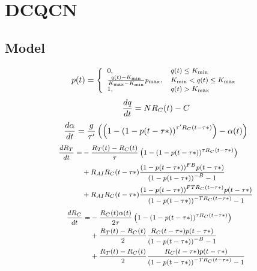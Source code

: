 \section{DCQCN}

\subsection{Model}

\begin{equation}
\small
p(t) = \left\{ \begin{array}{ll}
{\rm{0,}} & q(t) \le {K_{\min }}\\
\frac{{q(t) - {K_{\min }}}}{{{K_{\max }} - {K_{\min }}}}{p_{\max }}, & {K_{\min }} < q(t) \le {K_{\max }}\\
{\rm{1,}} & q(t) > {K_{\max }}
\end{array} \right.
\label{eq:mark}
\end{equation}
\begin{equation}
\small
\frac{{dq}}{{dt}} = N{R_C}(t) - C
\label{eq:q}
\end{equation}
\begin{equation}
\small
\frac{{d\alpha }}{{dt}} = \frac{g}{{\tau '}}\left( {\left( {1 - {{(1 - p(t - \tau *))}^{\tau '{R_C}(t - \tau *)}}} \right) - \alpha (t)} \right)
\label{eq:alpha}
\end{equation}
\begin{equation}
\small
\begin{split}
\frac{{d{R_T}}}{{dt}} = & - \frac{{{R_T}(t) - {R_C}(t)}}{\tau }\left( {1 - {{(1 - p(t - \tau *))}^{\tau {R_C}(t - \tau *)}}} \right) \\
& + {R_{AI}}{R_C}(t - \tau *)\frac{{{{(1 - p(t - \tau *))}^{FB}}p(t - \tau *)}}{{{{(1 - p(t - \tau *))}^{ - B}} - 1}} \\
& + {R_{AI}}{R_C}(t - \tau *)\frac{{{{(1 - p(t - \tau *))}^{FT{R_C}(t - \tau *)}}p(t - \tau *)}}{{{{(1 - p(t - \tau *))}^{ - T{R_C}(t - \tau *)}} - 1}}
\end{split}
\label{eq:target}
\end{equation}
\begin{equation}
\small
\begin{split}
\frac{{d{R_C}}}{{dt}} = & - \frac{{{R_C}(t)\alpha (t)}}{{2\tau }}\left( {1 - {{(1 - p(t - \tau *))}^{\tau {R_C}(t - \tau *)}}} \right) \\
 & + \frac{{{R_T}(t) - {R_C}(t)}}{2}\frac{{{R_C}(t - \tau *)p(t - \tau *)}}{{{{(1 - p(t - \tau *))}^{ - B}} - 1}} \\ 
 & + \frac{{{R_T}(t) - {R_C}(t)}}{2}\frac{{{R_C}(t - \tau *)p(t - \tau *)}}{{{{(1 - p(t - \tau *))}^{ - T{R_C}(t - \tau *)}} - 1}}
\end{split}
\label{eq:current}
\end{equation}

